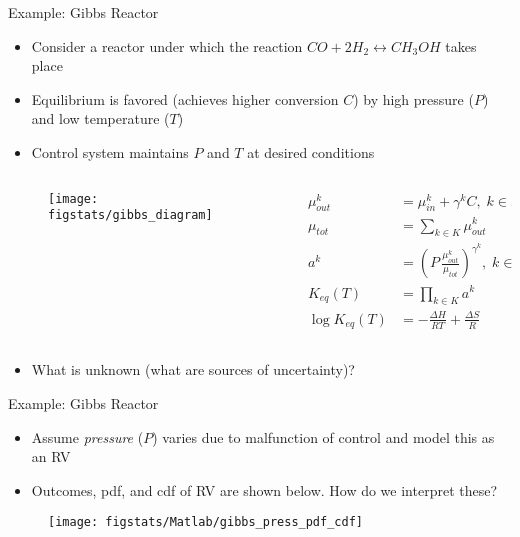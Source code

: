 \documentclass[9pt]{beamer}
\begin{document}
\begin{frame}{Example: Gibbs Reactor}

\begin{itemize}
\item Consider a reactor under which the reaction $CO+2H_2\leftrightarrow CH_3OH$ takes place
\item Equilibrium is favored (achieves higher conversion $C$) by high pressure ($P$) and low temperature ($T$)
\item Control system maintains $P$ and $T$ at desired conditions
\end{itemize}

\begin{columns}
\begin{column}{0.3\textwidth}
\begin{figure}[!htb]
    \centering
	\texttt{[image: figstats/gibbs\_diagram]}
\end{figure}
\end{column}
\begin{column}{0.5\textwidth}
\begin{align*}
\mu_{out}^k&=\mu_{in}^k+\gamma^kC,\;k\in K\\
\mu_{tot}&=\sum_{k\in K}\mu_{out}^k\\
a^k&=\left(P\,\frac{\mu_{out}^k}{\mu_{tot}}\right)^{\gamma^k},\;k\in K\\
K_{eq}(T)&=\prod_{k\in K}a^k\\
\log K_{eq}(T)&=-\frac{\Delta H}{RT}+\frac{\Delta S}{R}
\end{align*}
\end{column}

\end{columns}


\begin{block}{}
\begin{itemize}
\item What is unknown (what are sources of uncertainty)?
\end{itemize}
\end{block}
\end{frame}

\begin{frame}{Example: Gibbs Reactor}

\begin{itemize}
\item Assume {\em pressure} ($P$) varies due to malfunction of control and model this as an RV
\item Outcomes, pdf, and cdf of RV are shown below. How do we interpret these? 
\end{itemize}
\begin{figure}[!htb]
    \centering
	\texttt{[image: figstats/Matlab/gibbs\_press\_pdf\_cdf]}
\end{figure}

\end{frame}
\end{document}
